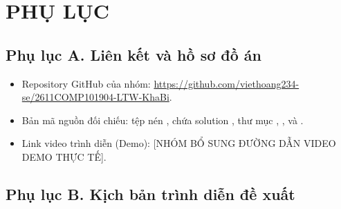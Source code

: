 \chapter*{PHỤ LỤC}

\section*{Phụ lục A. Liên kết và hồ sơ đồ án}

\begin{itemize}

\item Repository GitHub của nhóm: \url{https://github.com/viethoang234-se/2611COMP101904-LTW-KhaBi}.

\item Bản mã nguồn đối chiếu: tệp nén , chứa solution , thư mục , ,  và .

\item Link video trình diễn (Demo): [NHÓM BỔ SUNG ĐƯỜNG DẪN VIDEO DEMO THỰC TẾ].

\end{itemize}

\section*{Phụ lục B. Kịch bản trình diễn đề xuất}

